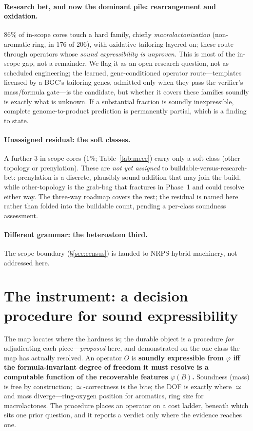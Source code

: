 \documentclass[11pt]{article}
\begin{document}
\paragraph{Research bet, and now the dominant pile: rearrangement and oxidation.} $86\%$ of in-scope
cores touch a hard family, chiefly \emph{macrolactonization} (non-aromatic ring, in $176$ of $206$),
with oxidative tailoring layered on; these route through operators whose \emph{sound expressibility is
unproven}. This is most of the in-scope gap, not a remainder. We flag it as an open research question,
not as scheduled engineering;
the learned, gene-conditioned operator route---templates licensed by a BGC's tailoring genes, admitted
only when they pass the verifier's mass/formula gate---is the candidate, but whether it covers these
families soundly is exactly what is unknown. If a substantial fraction is soundly inexpressible,
complete genome-to-product prediction is permanently partial, which is a finding to state.

\paragraph{Unassigned residual: the soft classes.} A further $3$ in-scope cores ($1\%$;
Table~\ref{tab:mece}) carry only a soft class (other-topology or prenylation). These are \emph{not yet
assigned} to buildable-versus-research-bet: prenylation is a discrete, plausibly sound addition that
may join the build, while other-topology is the grab-bag that fractures in Phase~1 and could resolve
either way. The three-way roadmap covers the rest; the residual is named here rather than folded into
the buildable count, pending a per-class soundness assessment.

\paragraph{Different grammar: the heteroatom third.} The scope boundary (\S\ref{sec:census}) is handed
to NRPS-hybrid machinery, not addressed here.

\section{The instrument: a decision procedure for sound expressibility}
\label{sec:procedure}
The map locates where the hardness is; the durable object is a procedure \emph{for} adjudicating each
piece---\emph{proposed} here, and demonstrated on the one class the map has actually resolved. An operator $O$ is \textbf{soundly expressible from $\varphi$ iff the
formula-invariant degree of freedom it must resolve is a computable function of the recoverable
features $\varphi(B)$.} Soundness (mass) is free by construction; $\simeq$-correctness is the bite;
the DOF is exactly where $\simeq$ and mass diverge---ring-oxygen position for aromatics, ring size for
macrolactones. The procedure places an operator on a cost ladder, beneath which sits one prior
question, and it reports a verdict only where the evidence reaches one.
\end{document}
